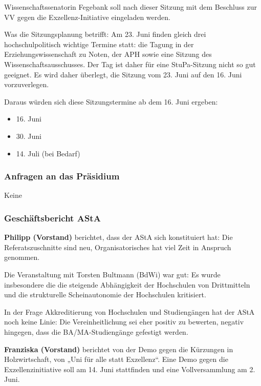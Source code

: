\documentclass[ngerman,headheight=70pt]{scrartcl}
\begin{document}
    Wissenschaftssenatorin Fegebank soll nach dieser Sitzung mit dem Beschluss
    zur VV gegen die Exzellenz-Initiative eingeladen werden.

    Was die Sitzungsplanung betrifft: Am 23. Juni finden gleich drei
    hochschulpolitisch wichtige Termine statt: die Tagung in der
    Erziehungswissenschaft zu Noten,  der APH sowie eine Sitzung des
    Wissenschaftsausschusses. Der Tag ist daher für eine StuPa-Sitzung nicht so
    gut geeignet. Es wird daher überlegt, die Sitzung vom 23. Juni auf den 16.
    Juni vorzuverlegen.

    Daraus würden sich diese Sitzungstermine ab dem 16. Juni ergeben:
    \begin{itemize}
        \item 16. Juni
        \item 30. Juni
        \item 14. Juli (bei Bedarf)
    \end{itemize}

    \subsubsection{Anfragen an das Präsidium}

    Keine

    \subsubsection{Geschäftsbericht AStA}

    \textbf{Philipp (Vorstand)} berichtet, dass der AStA sich konstituiert hat:
    Die Referatszuschnitte sind neu, Organisatorisches hat viel Zeit in Anspruch
    genommen.

    Die Veranstaltung mit Torsten Bultmann (BdWi) war gut: Es wurde insbesondere
    die die steigende Abhängigkeit der Hochschulen von Drittmitteln und die
    strukturelle Scheinautonomie der Hochschulen kritisiert.

    In der Frage Akkreditierung von Hochschulen und Studiengängen hat der AStA
    noch keine Linie: Die Vereinheitlichung sei eher positiv zu bewerten, negativ
    hingegen, dass die BA/MA-Studiengänge gefestigt werden.

    \textbf{Franziska (Vorstand)} berichtet von der Demo gegen die Kürzungen in
    Holzwirtschaft, von „Uni für alle statt Exzellenz“. Eine Demo gegen die
    Exzellenzinitiative soll am 14. Juni stattfinden und eine Vollversammlung
    am 2. Juni.
\end{document}
